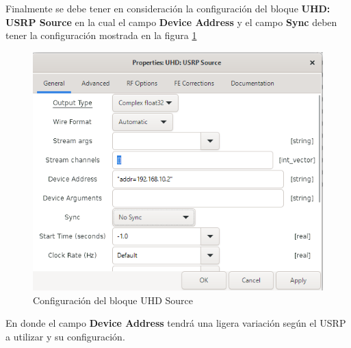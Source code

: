 \documentclass[12pt]{report}
\begin{document}
	\newpage
	Finalmente se debe tener en consideración la configuración del bloque \textbf{UHD: USRP Source} en la cual el campo \textbf{Device Address} y el campo \textbf{Sync} deben tener la configuración mostrada en la figura \ref{fig:gnu-radio-bloques-source}
	
	\begin{figure}[h]
		\centering
		\includegraphics[width=0.6\linewidth]{media/gnu-radio-bloques-source}
		\caption{Configuración del bloque UHD Source}
		\label{fig:gnu-radio-bloques-source}
	\end{figure}
	
	En donde el campo \textbf{Device Address} tendrá una ligera variación según el USRP a utilizar y su configuración.
	
	
\end{document}
